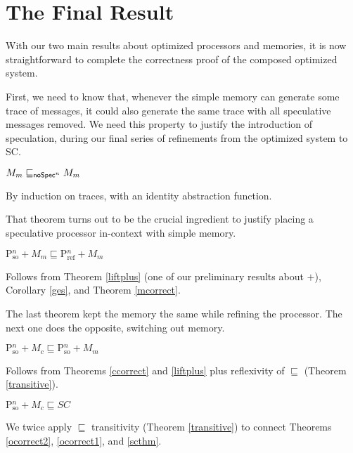 \section{The Final Result}\label{sec:finalresult}

With our two main results about optimized processors and memories, it
is now straightforward to complete the correctness proof of the
composed optimized system.

First, we need to know that, whenever the simple memory can generate
some trace of messages, it could also generate the same trace with all
speculative messages removed.  We need this property to justify the
introduction of speculation, during our final series of refinements
from the optimized system to SC.

\begin{theorem}
\label{mcorrect}
$M_m \sqsubseteq_{\mathsf{noSpec}^n} M_m$
\end{theorem}
\begin{prf}
By induction on traces, with an identity abstraction function.
\end{prf}

That theorem turns out to be the crucial ingredient to justify placing
a speculative processor in-context with simple memory.

\begin{theorem}
\label{ocorrect1}
$\text{P$^n_\text{so}$} + M_m \sqsubseteq \text{P$^n_\text{ref}$} + M_m$
\end{theorem}
\begin{prf}
Follows from Theorem \ref{liftplus} (one of our preliminary results
about $+$), Corollary \ref{ges}, and Theorem \ref{mcorrect}.
\end{prf}

The last theorem kept the memory the same while refining the
processor.  The next one does the opposite, switching out memory.

\begin{theorem}
\label{ocorrect2}
$\text{P$^n_\text{so}$} + M_c \sqsubseteq \text{P$^n_\text{so}$} + M_m$
\end{theorem}
\begin{prf}
Follows from Theorems \ref{ccorrect} and \ref{liftplus} plus reflexivity of $\sqsubseteq$ (Theorem \ref{transitive}).
\end{prf}

\begin{theorem}
\label{ofull}
$\text{P$^n_\text{so}$} + M_c \sqsubseteq SC$
\end{theorem}
\begin{prf}
We twice apply $\sqsubseteq$ transitivity (Theorem \ref{transitive}) to
connect Theorems \ref{ocorrect2}, \ref{ocorrect1}, and \ref{scthm}.
\end{prf}
